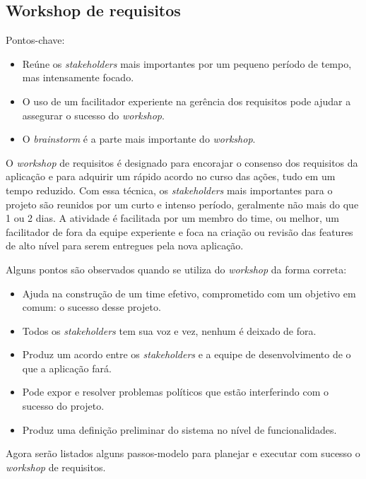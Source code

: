     \subsection{Workshop de requisitos}
    
      Pontos-chave:
      \begin{itemize}
       \item Reúne os \textit{stakeholders} mais importantes por um pequeno período de tempo, mas intensamente focado.
       \item O uso de um facilitador experiente na gerência dos requisitos pode ajudar a assegurar o sucesso do \textit{workshop}.
       \item O \textit{brainstorm} é a parte mais importante do \textit{workshop}.
      \end{itemize}
      
      O \textit{workshop} de requisitos é designado para encorajar o consenso dos requisitos da aplicação 
      e para adquirir um rápido acordo no curso das ações, 
      tudo em um tempo reduzido. Com essa técnica, os \textit{stakeholders} mais importantes para o projeto são 
      reunidos por um curto e intenso período, geralmente não mais do que 1 ou 2 dias. 
      A atividade é facilitada por um membro do time, ou melhor, 
      um facilitador de fora da equipe experiente e foca na criação ou revisão das features de alto nível 
      para serem entregues pela nova aplicação.
      
      Alguns pontos são observados quando se utiliza do \textit{workshop} da forma correta:
      \begin{itemize}
       \item Ajuda na construção de um time efetivo, comprometido com um objetivo em comum: o sucesso desse projeto.
       \item Todos os \textit{stakeholders} tem sua voz e vez, nenhum é deixado de fora.
       \item Produz um acordo entre os \textit{stakeholders} e a equipe de desenvolvimento de o que a aplicação fará.
       \item Pode expor e resolver problemas políticos que estão interferindo com o sucesso do projeto.
       \item Produz uma definição preliminar do sistema no nível de funcionalidades.
      \end{itemize}
      
      Agora serão listados alguns passos-modelo para planejar e executar com sucesso o \textit{workshop} de requisitos.
